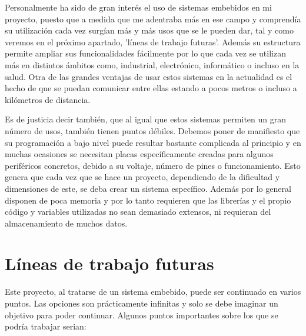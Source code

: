 Personalmente ha sido de gran interés el uso de sistemas embebidos en mi proyecto, puesto que a medida que me adentraba más en ese campo y comprendía su utilización cada vez surgían más y más usos que se le pueden dar, tal y como veremos en el próximo apartado, 'líneas de trabajo futuras'. Además su estructura permite ampliar sus funcionalidades fácilmente por lo que cada vez se utilizan más en distintos ámbitos como, industrial, electrónico, informático o incluso en la salud. 
Otra de las grandes ventajas de usar estos sistemas en la actualidad es el hecho de que se puedan comunicar entre ellas estando a pocos metros o incluso a kilómetros de distancia. 

Es de justicia decir también, que al igual que estos sistemas permiten un gran número de usos, también tienen puntos débiles. Debemos poner de manifiesto que su programación a bajo nivel puede resultar bastante complicada al principio y en muchas ocasiones se necesitan placas específicamente creadas para algunos periféricos concretos, debido a su voltaje, número de pines o funcionamiento. Esto genera que cada vez que se hace un proyecto, dependiendo de la dificultad y dimensiones de este, se deba crear un sistema específico. Además por lo general disponen de poca memoria y por lo tanto requieren que las librerías y el propio código y variables utilizadas no sean demasiado extensos, ni requieran del almacenamiento de muchos datos.


\section{Líneas de trabajo futuras}\label{sec:LTF}

Este proyecto, al tratarse de un sistema embebido, puede ser continuado en varios puntos. Las opciones son prácticamente infinitas y solo se debe imaginar un objetivo para poder continuar. Algunos puntos importantes sobre los que se podría trabajar serian:

